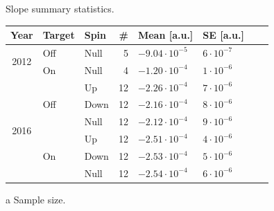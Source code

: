 \documentclass[reprint, superscriptaddress]{revtex4-1}
\newcommand{\vp}[2]{#1\cdot10^{#2}}
\begin{document}
\begin{threeparttable}[h]
	\centering
	\caption{Slope summary statistics. \label{tbl:Slp-big}}
	\begin{tabular}{c|llrllrr}
		\hline\hline
		        Year          & Target               & Spin & \#\tnote{a} & Mean [a.u.]      & SE [a.u.]    &  \\ \hline
		\multirow{2}{*}{2012} & Off                  & Null & 5           & $\vp{-9.04}{-5}$ & $\vp{6}{-7}$ &  \\
		                      & On                   & Null & 4           & $\vp{-1.20}{-4}$ & $\vp{1}{-6}$ &  \\ \hline
		\multirow{6}{*}{2016} & \multirow{3}{*}{Off} & Up   & 12          & $\vp{-2.26}{-4}$ & $\vp{7}{-6}$ &  \\
		                      &                      & Down & 12          & $\vp{-2.16}{-4}$ & $\vp{8}{-6}$ &  \\
		                      &                      & Null & 12          & $\vp{-2.12}{-4}$ & $\vp{9}{-6}$ &  \\
		                      & \multirow{3}{*}{On}  & Up   & 12          & $\vp{-2.51}{-4}$ & $\vp{4}{-6}$ &  \\
		                      &                      & Down & 12          & $\vp{-2.53}{-4}$ & $\vp{5}{-6}$ &  \\
		                      &                      & Null & 12          & $\vp{-2.54}{-4}$ & $\vp{6}{-6}$ &  \\ \hline\hline
	\end{tabular}
	\begin{tablenotes}
		\item[a]{Sample size.}
	\end{tablenotes}
\end{threeparttable}
\end{document}
